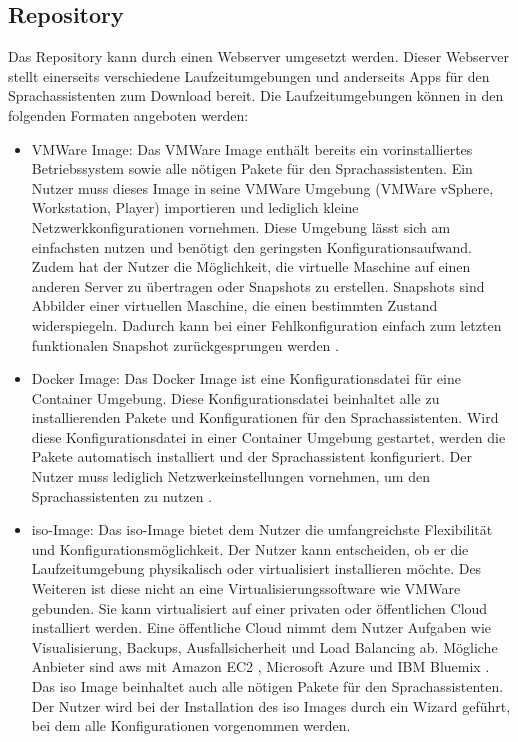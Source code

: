 \subsection{Repository}
Das Repository kann durch einen Webserver umgesetzt werden. Dieser Webserver stellt einerseits verschiedene Laufzeitumgebungen und anderseits Apps für den Sprachassistenten zum Download bereit. Die Laufzeitumgebungen können in den folgenden Formaten angeboten werden:
\begin{itemize}
	\item VMWare Image: Das VMWare Image enthält bereits ein vorinstalliertes Betriebssystem sowie alle nötigen Pakete für den Sprachassistenten. Ein Nutzer muss dieses Image in seine VMWare Umgebung (VMWare vSphere, Workstation, Player) importieren und lediglich kleine Netzwerkkonfigurationen vornehmen. Diese Umgebung lässt sich am einfachsten nutzen und benötigt den geringsten Konfigurationsaufwand. Zudem hat der Nutzer die Möglichkeit, die virtuelle Maschine auf einen anderen Server zu übertragen oder Snapshots zu erstellen. Snapshots sind Abbilder einer virtuellen Maschine, die einen bestimmten Zustand widerspiegeln. Dadurch kann bei einer Fehlkonfiguration einfach zum letzten funktionalen Snapshot zurückgesprungen werden \cite{VMWare}.
	\item Docker Image: Das Docker Image ist eine Konfigurationsdatei für eine Container Umgebung. Diese Konfigurationsdatei beinhaltet alle zu installierenden Pakete und Konfigurationen für den Sprachassistenten. Wird diese Konfigurationsdatei in einer Container Umgebung gestartet, werden die Pakete automatisch installiert und der Sprachassistent konfiguriert. Der Nutzer muss lediglich Netzwerkeinstellungen vornehmen, um den Sprachassistenten zu nutzen \cite{Docker}.
	\item \acs{iso}-Image: Das \acs{iso}-Image bietet dem Nutzer die umfangreichste Flexibilität und Konfigurationsmöglichkeit. Der Nutzer kann entscheiden, ob er die Laufzeitumgebung physikalisch oder virtualisiert installieren möchte. Des Weiteren ist diese nicht an eine Virtualisierungssoftware wie VMWare gebunden. Sie kann virtualisiert auf einer privaten oder öffentlichen Cloud installiert werden. Eine öffentliche Cloud nimmt dem Nutzer Aufgaben wie Visualisierung, Backups, Ausfallsicherheit und Load Balancing ab. Mögliche Anbieter sind \ac{aws} mit Amazon EC2 \cite{AWSAmazonEC2}, Microsoft Azure \cite{MicrosoftAzure} und IBM Bluemix \cite{IBMBluemix}. Das \acs{iso} Image beinhaltet auch alle nötigen Pakete für den Sprachassistenten. Der Nutzer wird bei der Installation des \acs{iso} Images durch ein Wizard geführt, bei dem alle Konfigurationen vorgenommen werden.
\end{itemize}

